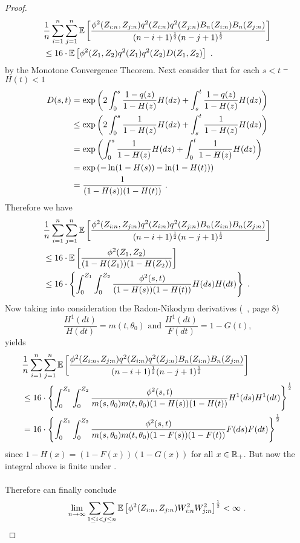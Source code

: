 \begin{lemma}
\begin{proof}
		\begin{align*}
		&\frac{1}{n}\sum_{i=1}^{n}\sum_{j=1}^{n}\mathbb{E}\left[\frac{\phi^2(Z_{i:n}, Z_{j:n}) q^2(Z_{i:n})q^2(Z_{j:n}) B_n(Z_{i:n})B_n(Z_{j:n})}{(n-i+1)^\frac{1}{2}(n-j+1)^\frac{1}{2}}\right]\\
		&\leq 16\cdot\mathbb{E}\left[\phi^2(Z_{1}, Z_{2}) q^2(Z_{1})q^2(Z_{2})D(Z_1,Z_2)\right]\textrm{ .}
		\end{align*}		
		by the Monotone Convergence Theorem.
		Next consider that for each $s<t$ \st\ $H(t)<1$
		\begin{align*}
		D(s,t) &= \exp\left(2\int_{0}^{s} \frac{1-q(z)}{1-H(z)} H(dz) + \int_{s}^{t} \frac{1-q(z)}{1-H(z)} H(dz)\right)\\
		&\leq \exp\left(2\int_{0}^{s} \frac{1}{1-H(z)} H(dz) + \int_{s}^{t} \frac{1}{1-H(z)} H(dz)\right)\\
		&= \exp\left(\int_{0}^{s} \frac{1}{1-H(z)} H(dz) + \int_{0}^{t} \frac{1}{1-H(z)} H(dz)\right)\\
		&= \exp\left(-\ln(1-H(s)) -\ln(1-H(t))\right)\\
		&= \frac{1}{(1-H(s))(1-H(t))}\textrm{ .}
		\end{align*}
		Therefore we have
		\begin{align*}
		&\frac{1}{n}\sum_{i=1}^{n}\sum_{j=1}^{n}\mathbb{E}\left[\frac{\phi^2(Z_{i:n}, Z_{j:n}) q^2(Z_{i:n})q^2(Z_{j:n}) B_n(Z_{i:n})B_n(Z_{j:n})}{(n-i+1)^\frac{1}{2}(n-j+1)^\frac{1}{2}}\right]\\
		&\leq 16\cdot\mathbb{E}\left[\frac{\phi^2(Z_{1}, Z_{2})}{(1-H(Z_1))(1-H(Z_2))}\right]\\
		&\leq 16\cdot\left\{\int_{0}^{Z_1} \int_{0}^{Z_2}\frac{\phi^2(s, t)}{(1-H(s))(1-H(t))} H(ds)H(dt)\right\}\textrm{ .}
		\end{align*}		
		Now taking into consideration the Radon-Nikodym derivatives (\cf\ \cite{dikta2000strong}, page 8)
		$$\frac{H^1(dt)}{H(dt)} = m(t,\theta_0) \textrm{ and } \frac{H^1(dt)}{F(dt)} = 1-G(t) \textrm{,}$$
		yields
		\begin{align*}
		&\frac{1}{n}\sum_{i=1}^{n}\sum_{j=1}^{n}\mathbb{E}\left[\frac{\phi^2(Z_{i:n}, Z_{j:n}) q^2(Z_{i:n})q^2(Z_{j:n}) B_n(Z_{i:n})B_n(Z_{j:n})}{(n-i+1)^\frac{1}{2}(n-j+1)^\frac{1}{2}}\right]\\
		&\leq 16\cdot\left\{\int_{0}^{Z_1} \int_{0}^{Z_2}\frac{\phi^2(s, t)}{m(s,\theta_0)m(t, \theta_0)(1-H(s))(1-H(t))} H^1(ds)H^1(dt)\right\}^{\frac{1}{2}}\\
		&= 16\cdot\left\{\int_{0}^{Z_1} \int_{0}^{Z_2}\frac{\phi^2(s, t)}{m(s,\theta_0)m(t, \theta_0)(1-F(s))(1-F(t))} F(ds)F(dt)\right\}^{\frac{1}{2}}
		\end{align*}	
		since $1-H(x) = (1-F(x))(1-G(x))$ for all $x\in \mathbb{R}_+$. But now the integral above is finite under .\\
		\\
		Therefore can finally conclude
		$$\lim\limits_{n\to\infty}\mathop{\sum\sum}\limits_{1\leq i<j\leq n}\mathbb{E}\left[\phi^2(Z_{i:n}, Z_{j:n}) W^2_{i:n} W^2_{j:n}\right]^{\frac{1}{2}} < \infty\textrm{ .}$$
	\end{proof}
\end{lemma}	
%
%
%
